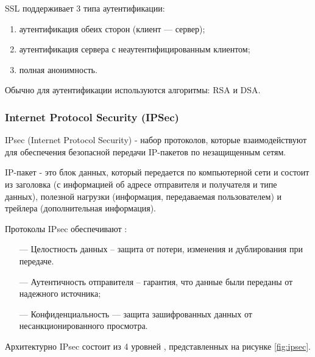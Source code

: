 SSL поддерживает 3 типа аутентификации:

\begin{enumerate}
	\item аутентификация обеих сторон (клиент — сервер);
	\item аутентификация сервера с неаутентифицированным клиентом;
	\item полная анонимность.
\end{enumerate}

Обычно для аутентификации используются алгоритмы: RSA и DSA. 

\subsubsection{Internet Protocol Security (IPSec)}

IPsec (Internet Protocol Security) - набор протоколов, которые взаимодействуют для обеспечения безопасной передачи IP-пакетов по незащищенным сетям.

IP-пакет - это блок данных, который передается по компьютерной сети и состоит из заголовка (с информацией об адресе отправителя и получателя и типе данных), полезной нагрузки (информация, передаваемая пользователем) и трейлера (дополнительная информация).

Протоколы IPsec обеспечивают \cite{ipsec}:

\begin{itemize}
	\item [---] Целостность данных -- защита от потери, изменения и дублирования при передаче.
	\item [---] Аутентичность отправителя -- гарантия, что данные были переданы от надежного источника;
	\item [---] Конфиденциальность — защита зашифрованных данных от несанкционированного просмотра.
\end{itemize}

Архитектурно IPsec состоит из 4 уровней \cite{ipsec}, представленных на рисунке \ref{fig:ipsec}.

